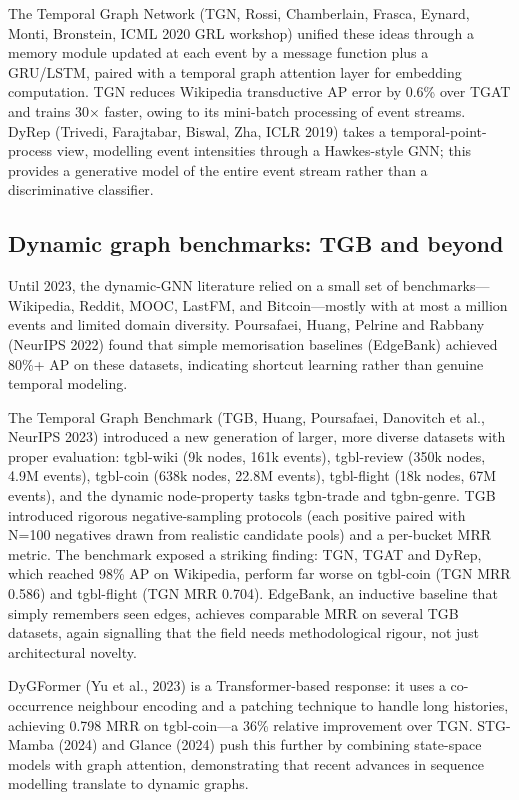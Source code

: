 The Temporal Graph Network (TGN, Rossi, Chamberlain, Frasca, Eynard, Monti, Bronstein, ICML 2020 GRL workshop) unified these ideas through a memory module updated at each event by a message function plus a GRU/LSTM, paired with a temporal graph attention layer for embedding computation. TGN reduces Wikipedia transductive AP error by 0.6\% over TGAT and trains 30× faster, owing to its mini-batch processing of event streams. DyRep (Trivedi, Farajtabar, Biswal, Zha, ICLR 2019) takes a temporal-point-process view, modelling event intensities through a Hawkes-style GNN; this provides a generative model of the entire event stream rather than a discriminative classifier.

\subsection{Dynamic graph benchmarks: TGB and beyond}\label{dynamic-graph-benchmarks-tgb-and-beyond}

Until 2023, the dynamic-GNN literature relied on a small set of benchmarks---Wikipedia, Reddit, MOOC, LastFM, and Bitcoin---mostly with at most a million events and limited domain diversity. Poursafaei, Huang, Pelrine and Rabbany (NeurIPS 2022) found that simple memorisation baselines (EdgeBank) achieved 80\%+ AP on these datasets, indicating shortcut learning rather than genuine temporal modeling.

The Temporal Graph Benchmark (TGB, Huang, Poursafaei, Danovitch et al., NeurIPS 2023) introduced a new generation of larger, more diverse datasets with proper evaluation: tgbl-wiki (9k nodes, 161k events), tgbl-review (350k nodes, 4.9M events), tgbl-coin (638k nodes, 22.8M events), tgbl-flight (18k nodes, 67M events), and the dynamic node-property tasks tgbn-trade and tgbn-genre. TGB introduced rigorous negative-sampling protocols (each positive paired with N=100 negatives drawn from realistic candidate pools) and a per-bucket MRR metric. The benchmark exposed a striking finding: TGN, TGAT and DyRep, which reached 98\% AP on Wikipedia, perform far worse on tgbl-coin (TGN MRR 0.586) and tgbl-flight (TGN MRR 0.704). EdgeBank, an inductive baseline that simply remembers seen edges, achieves comparable MRR on several TGB datasets, again signalling that the field needs methodological rigour, not just architectural novelty.

DyGFormer (Yu et al., 2023) is a Transformer-based response: it uses a co-occurrence neighbour encoding and a patching technique to handle long histories, achieving 0.798 MRR on tgbl-coin---a 36\% relative improvement over TGN. STG-Mamba (2024) and Glance (2024) push this further by combining state-space models with graph attention, demonstrating that recent advances in sequence modelling translate to dynamic graphs.

